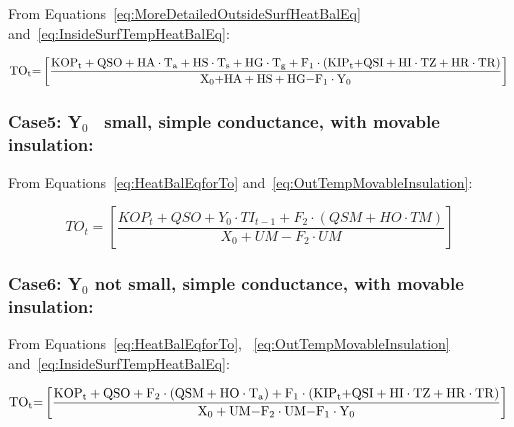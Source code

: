 From Equations~\ref{eq:MoreDetailedOutsideSurfHeatBalEq} and~\ref{eq:InsideSurfTempHeatBalEq}:

\begin{equation}
{\rm{T}}{{\rm{O}}_{\rm{t}}}{\rm{ = }}\left[ {\frac{{{\rm{KO}}{{\rm{P}}_{\rm{t}}} + {\rm{QSO}} + {\rm{HA}}\cdot {{\rm{T}}_{\rm{a}}} + {\rm{HS}}\cdot {{\rm{T}}_{\rm{s}}} + {\rm{HG}}\cdot {{\rm{T}}_{\rm{g}}} + {{\rm{F}}_{\rm{1}}}\cdot \left( {{\rm{KI}}{{\rm{P}}_{\rm{t}}}{\rm{ + QSI + HI}}\cdot {\rm{TZ + HR}}\cdot {\rm{TR}}} \right)}}{{{{\rm{X}}_{\rm{0}}}{\rm{ + HA + HS + HG - }}{{\rm{F}}_1}\cdot {{\rm{Y}}_0}}}} \right]{\rm{  }}
\end{equation}

\subsubsection{Case5: Y\(_{0}\)~ small, simple conductance, with movable insulation:}\label{case5-yux5f0-small-simple-conductance-with-movable-insulation}

From Equations~\ref{eq:HeatBalEqforTo} and~\ref{eq:OutTempMovableInsulation}:

\begin{equation}
TO_t = \left[ \frac{ KOP_t + QSO + Y_0 \cdot {TI_{t-1}} + F_2 \cdot \left( QSM + HO \cdot TM \right) } { X_0 + UM - F_2 \cdot UM } \right]
\label{eq:HeatBalanceEquationCase5}
\end{equation}

\subsubsection{Case6: Y\(_{0}\) not small, simple conductance, with movable insulation:}\label{case6-yux5f0-not-small-simple-conductance-with-movable-insulation}

From Equations~\ref{eq:HeatBalEqforTo}, ~\ref{eq:OutTempMovableInsulation} and~\ref{eq:InsideSurfTempHeatBalEq}:

\begin{equation}
{\rm{T}}{{\rm{O}}_{\rm{t}}}{\rm{ = }}\left[ {\frac{{{\rm{KO}}{{\rm{P}}_{\rm{t}}} + {\rm{QSO}} + {{\rm{F}}_2}\cdot \left( {{\rm{QSM + HO}}\cdot {{\rm{T}}_{\rm{a}}}} \right) + {{\rm{F}}_1}\cdot \left( {{\rm{KI}}{{\rm{P}}_{\rm{t}}}{\rm{ + QSI + HI}}\cdot {\rm{TZ + HR}}\cdot {\rm{TR}}} \right)}}{{{{\rm{X}}_{\rm{0}}} + {\rm{UM - }}{{\rm{F}}_{\rm{2}}}\cdot {\rm{UM - }}{{\rm{F}}_{\rm{1}}}\cdot {{\rm{Y}}_{\rm{0}}}}}} \right]{\rm{  }}
\label{eq:HeatBalanceEquationCase6}
\end{equation}

